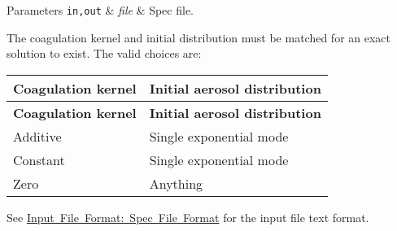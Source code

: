 \begin{DoxyParams}[1]{Parameters}
\mbox{\tt in,out}  & {\em file} & Spec file.\\
\hline
\end{DoxyParams}
The coagulation kernel and initial distribution must be matched for an exact solution to exist. The valid choices are\+:

\tabulinesep=1mm
\begin{longtabu} spread 0pt [c]{*{2}{|X[-1]}|}
\hline
\rowcolor{\tableheadbgcolor}\textbf{ Coagulation kernel }&\textbf{ Initial aerosol distribution }\\
\endfirsthead
\hline
\endfoot
\hline
\rowcolor{\tableheadbgcolor}\textbf{ Coagulation kernel }&\textbf{ Initial aerosol distribution }\\
\endhead
Additive &Single exponential mode \\
Constant &Single exponential mode \\
Zero &Anything \\
\end{longtabu}


See \mbox{\hyperlink{spec_file_format}{Input File Format\+: Spec File Format}} for the input file text format.

